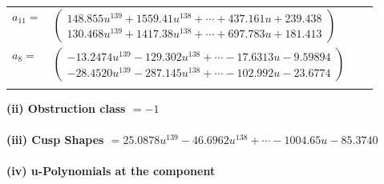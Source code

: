 \documentclass[1p]{elsarticle_modified}
\theoremstyle{definition}
\begin{document}
\begin{tabular}{m{7pt} m{180pt} m{7pt} m{180pt} }
\flushright $a_{11}=$&$\begin{pmatrix}148.855 u^{139}+1559.41 u^{138}+\cdots+437.161 u+239.438\\130.468 u^{139}+1417.38 u^{138}+\cdots+697.783 u+181.413\end{pmatrix}$ \\
\flushright $a_{8}=$&$\begin{pmatrix}-13.2474 u^{139}-129.302 u^{138}+\cdots-17.6313 u-9.59894\\-28.4520 u^{139}-287.145 u^{138}+\cdots-102.992 u-23.6774\end{pmatrix}$\\&\end{tabular}
\flushleft \textbf{(ii) Obstruction class $= -1$}\\~\\
\flushleft \textbf{(iii) Cusp Shapes $= 25.0878 u^{139}-46.6962 u^{138}+\cdots-1004.65 u-85.3740$}\\~\\
\newpage\renewcommand{\arraystretch}{1}
\flushleft \textbf{(iv) u-Polynomials at the component}\newline \\
\end{document}
